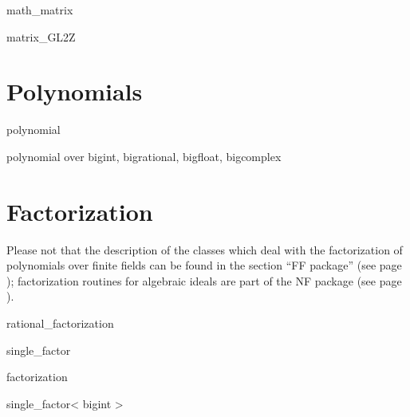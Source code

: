 \begin{class}{math_matrix}
  
\end{class}

\begin{class}{matrix_GL2Z}
  
\end{class}


\chapter{Polynomials}

\begin{class}{polynomial}
  
\end{class}

\begin{class}{polynomial over bigint, bigrational, bigfloat, bigcomplex}
  
\end{class}


\chapter{Factorization}

Please not that the description of the classes which deal with the factorization of polynomials
over finite fields can be found in the section ``\LiDIA FF package'' (see page
\pageref{LiDIA-FF}); factorization routines for algebraic ideals are part of the \LiDIA NF
package (see page \pageref{LiDIA-NF}).

\begin{class}{rational_factorization}
  
\end{class}

%  

\begin{class}{single_factor}
  
\end{class}

\begin{class}{factorization} \label{LiDIA-base:factorization}
  
\end{class}

\begin{class}{single_factor< bigint >}
  
\end{class}



